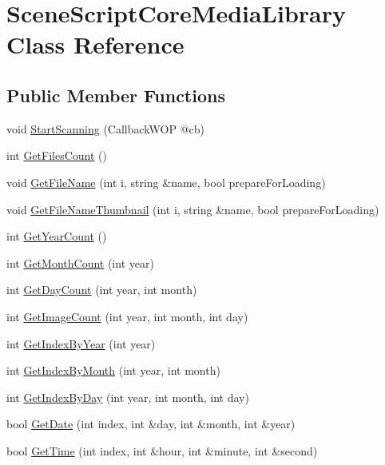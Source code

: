 \hypertarget{class_scene_script_core_media_library}{}\section{Scene\+Script\+Core\+Media\+Library Class Reference}
\label{class_scene_script_core_media_library}
\subsection*{Public Member Functions}
\begin{DoxyCompactItemize}
\item 
void \hyperlink{class_scene_script_core_media_library_a148bb37ee5baefd3cbb27ec37f3734b6}{Start\+Scanning} (Callback\+W\+OP @cb)
\item 
int \hyperlink{class_scene_script_core_media_library_ab8aca7994620b7bac0c292ffc6bdcec1}{Get\+Files\+Count} ()
\item 
void \hyperlink{class_scene_script_core_media_library_a69861b7edff353fe6dc70db4bdef4d9b}{Get\+File\+Name} (int i, string \&name, bool prepare\+For\+Loading)
\item 
void \hyperlink{class_scene_script_core_media_library_a047cee9cdba218c2e06da622441097f4}{Get\+File\+Name\+Thumbnail} (int i, string \&name, bool prepare\+For\+Loading)
\item 
int \hyperlink{class_scene_script_core_media_library_a1a16e293f17ecaa6740c4f6c1249f144}{Get\+Year\+Count} ()
\item 
int \hyperlink{class_scene_script_core_media_library_aee291d0ed9ab93b83ef8611458931920}{Get\+Month\+Count} (int year)
\item 
int \hyperlink{class_scene_script_core_media_library_ab54cb64743e883a4456474701fb571c4}{Get\+Day\+Count} (int year, int month)
\item 
int \hyperlink{class_scene_script_core_media_library_a0f492c5e7ad3229385a3754bc921b785}{Get\+Image\+Count} (int year, int month, int day)
\item 
int \hyperlink{class_scene_script_core_media_library_aef3e6ac69fa71d31186775ea53973fa5}{Get\+Index\+By\+Year} (int year)
\item 
int \hyperlink{class_scene_script_core_media_library_aa6843715e94126a2825108b43533a1b5}{Get\+Index\+By\+Month} (int year, int month)
\item 
int \hyperlink{class_scene_script_core_media_library_a5c216bfe2be428a4eb9ea20e6e88b524}{Get\+Index\+By\+Day} (int year, int month, int day)
\item 
bool \hyperlink{class_scene_script_core_media_library_aedddff0e996a44c99fa3910247f37547}{Get\+Date} (int index, int \&day, int \&month, int \&year)
\item 
bool \hyperlink{class_scene_script_core_media_library_a715410e790251617603dd16d35f5d31d}{Get\+Time} (int index, int \&hour, int \&minute, int \&second)
\end{DoxyCompactItemize}


